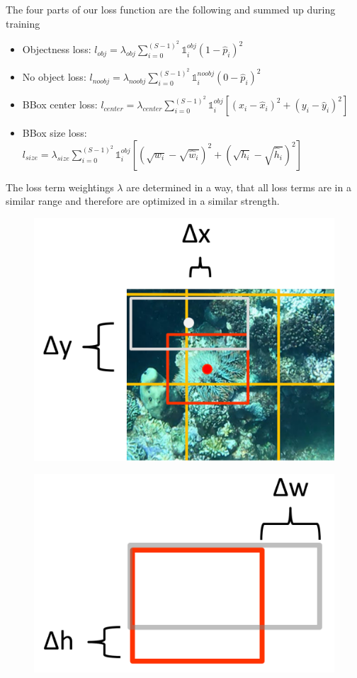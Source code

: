 \documentclass[landscape,a2,final,12pt]{issposter}
\begin{document}
\begin{multicols}{3}
\begin{samepage}
\begin{minipage}[t]{0.3\textwidth}
\begin{small}
            The four parts of our loss function are the following and summed up during training 
            \begin{itemize}
                \item Objectness loss: \quad $l_{obj} = \lambda_{obj} \sum_{i=0}^{(S-1)^2} \mathds{1}_{i}^{obj} (1 - \hat{p}_i)^2  $
                \item No object loss: \quad \quad $l_{noobj} = \lambda_{noobj} \sum_{i=0}^{(S-1)^2} \mathds{1}_{i}^{noobj} (0 - \hat{p}_i)^2  $
                \item BBox center loss: \quad $l_{center} = \lambda_{center} \sum_{i=0}^{(S-1)^2} \mathds{1}_{i}^{obj} [(x_i - \hat{x}_i)^2 + (y_i - \hat{y}_i)^2] $
                \item BBox size loss: \quad $l_{size} = \lambda_{size} \sum_{i=0}^{(S-1)^2} \mathds{1}_{i}^{obj} [(\sqrt{w_i} - \sqrt{\hat{w}_i})^2 + (\sqrt{h_i} - \sqrt{\hat{h}_i})^2] $
            \end{itemize}

            The loss term weightings $\lambda$ are determined in a way, that all loss terms are in a 
            similar range and therefore are optimized in a similar strength.

            \begin{figure}
                \centering
                \begin{minipage}{.5\textwidth}
                \centering
                \includegraphics[width=.4\linewidth]{5_loss_center.png}
                \label{fig:test1}
                \end{minipage}%
                \begin{minipage}{.5\textwidth}
                \centering
                \includegraphics[width=.4\linewidth]{5_loss_size.png}
                \label{fig:test2}
                \end{minipage}
                \end{figure}
            


\end{small}
\end{minipage}
\end{samepage}
\end{multicols}
\end{document}
